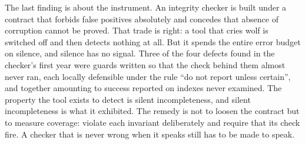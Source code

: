 The last finding is about the instrument. An integrity checker is built under a
contract that forbids false positives absolutely and concedes that absence of
corruption cannot be proved. That trade is right: a tool that cries wolf is
switched off and then detects nothing at all. But it spends the entire error
budget on silence, and silence has no signal. Three of the four defects found in
the checker's first year were guards written so that the check behind them almost
never ran, each locally defensible under the rule ``do not report unless
certain'', and together amounting to success reported on indexes never examined.
The property the tool exists to detect is silent incompleteness, and silent
incompleteness is what it exhibited. The remedy is not to loosen the contract but
to measure coverage: violate each invariant deliberately and require that its
check fire. A checker that is never wrong when it speaks still has to be made to
speak.

